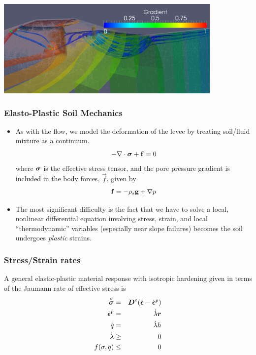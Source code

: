 \documentclass{beamer}
\newcommand{\Jrate}[1]{\stackrel{\circ}{#1}}
\begin{document}
\begin{frame}
\includegraphics[width=4.35in]{pocketLevee3d_pipe.png}
\end{frame}

\begin{frame}
  \frametitle{Elasto-Plastic Soil Mechanics}
  \begin{itemize}
    \item As with the flow, we model the deformation of the levee by
      treating soil/fluid mixture as a continuum.
      \begin{equation}
        - \nabla \cdot \mbox{{\boldmath ${\sigma}$}}  + {\bf f} = 0
      \end{equation}
      where $\mbox{{\boldmath ${\sigma}$}}$ is the effective stress tensor, and the pore
      pressure gradient is included in the body forces, $\vec f$, given by
      \begin{equation}
        {\bf f} = -\rho_s {\bf g} + \nabla p
      \end{equation}
    \item The most significant difficulty is the fact that we have to
      solve a local, nonlinear differential equation involving stress,
      strain, and local ``thermodynamic'' variables (especially near
      slope failures) becomes the soil undergoes {\em plastic}
      strains.
  \end{itemize}
\end{frame}

\begin{frame}
  \frametitle{Stress/Strain rates} A general elastic-plastic material
  response with isotropic hardening given in terms of the Jaumann rate
  of effective stress is
\begin{eqnarray}
\Jrate{\ten{ \sigma}}  &=& \ten D^e (\dot{\ten \epsilon} - \dot{\ten \epsilon}^p) \\
\dot{\ten \epsilon}^p &=& \dot{\lambda} \ten r \\
\dot{q} &=& \dot{\lambda} h \\
\dot{\lambda} &\geq& 0 \\
f(\sigma,q) &\leq& 0
\end{eqnarray}
\end{frame}
\end{document}
